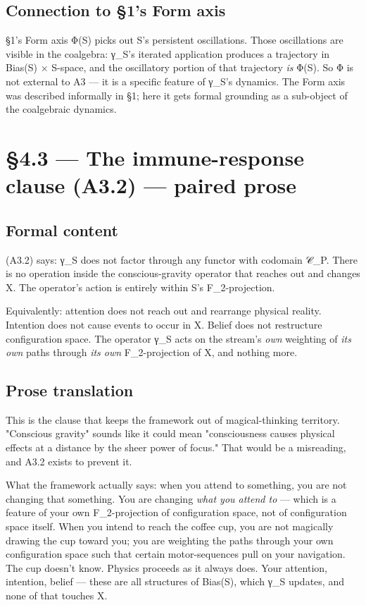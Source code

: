 \documentclass[11pt, openany]{book}
\newcommand{\sectionbreak}{\clearpage}
\begin{document}
\subsection{Connection to §1's Form axis}

§1's Form axis Φ(S) picks out S's persistent oscillations. Those oscillations are visible in the coalgebra: γ\_\allowbreak{}S's iterated application produces a trajectory in Bias(S) × S-space, and the oscillatory portion of that trajectory \textit{is} Φ(S). So Φ is not external to A3 --- it is a specific feature of γ\_\allowbreak{}S's dynamics. The Form axis was described informally in §1; here it gets formal grounding as a sub-object of the coalgebraic dynamics.

\sectionbreak

\section{§4.3 --- The immune-response clause (A3.2) --- paired prose}

\subsection{Formal content}

(A3.2) says: γ\_\allowbreak{}S does not factor through any functor with codomain 𝒞\_\allowbreak{}P. There is no operation inside the conscious-gravity operator that reaches out and changes X. The operator's action is entirely within S's F\_\allowbreak{}2-projection.

Equivalently: attention does not reach out and rearrange physical reality. Intention does not cause events to occur in X. Belief does not restructure configuration space. The operator γ\_\allowbreak{}S acts on the stream's \textit{own} weighting of \textit{its own} paths through \textit{its own} F\_\allowbreak{}2-projection of X, and nothing more.

\subsection{Prose translation}

This is the clause that keeps the framework out of magical-thinking territory. "Conscious gravity" sounds like it could mean "consciousness causes physical effects at a distance by the sheer power of focus." That would be a misreading, and A3.2 exists to prevent it.

What the framework actually says: when you attend to something, you are not changing that something. You are changing \textit{what you attend to} --- which is a feature of your own F\_\allowbreak{}2-projection of configuration space, not of configuration space itself. When you intend to reach the coffee cup, you are not magically drawing the cup toward you; you are weighting the paths through your own configuration space such that certain motor-sequences pull on your navigation. The cup doesn't know. Physics proceeds as it always does. Your attention, intention, belief --- these are all structures of Bias(S), which γ\_\allowbreak{}S updates, and none of that touches X.
\end{document}
